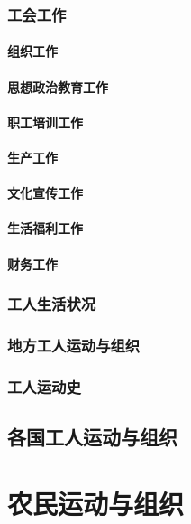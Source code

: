 \documentclass[UTF8]{../RepresentationUniverse}
\begin{document}
    \subsubsection{工会工作}
        \paragraph{组织工作}
        \paragraph{思想政治教育工作}
        \paragraph{职工培训工作}
        \paragraph{生产工作}
        \paragraph{文化宣传工作}
        \paragraph{生活福利工作}
        \paragraph{财务工作}
    \subsubsection{工人生活状况}
    \subsubsection{地方工人运动与组织}
    \subsubsection{工人运动史}

\subsection{各国工人运动与组织}



\section{农民运动与组织}
\end{document}
